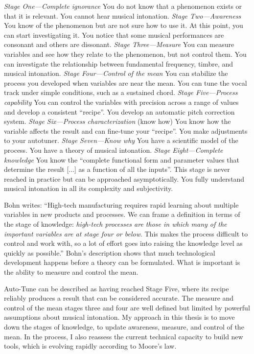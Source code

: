 \textit{Stage One---Complete ignorance} You do not know that a phenomenon exists or that it is relevant. You cannot hear musical intonation.
\textit{Stage Two---Awareness} You know of the phenomenon but are not sure how to use it. At this point, you can start investigating it. You notice that some musical performances are consonant and others are dissonant.
\textit{Stage Three---Measure}
You can measure variables and see how they relate to the phenomenon, but not control them. You can investigate the relationship between fundamental frequency, timbre, and musical intonation.
\textit{Stage Four---Control of the mean}
You can stabilize the process you developed when variables are near the mean. You can tune the vocal track under simple conditions, such as a sustained chord. 
\textit{Stage Five---Process capability}
You can control the variables with precision across a range of values and develop a consistent ``recipe''. You develop an automatic pitch correction system.
\textit{Stage Six---Process characterization} (know how)
You know how the variable affects the result and can fine-tune your ``recipe''. You make adjustments to your autotuner.
\textit{Stage Seven---Know why}
You have a scientific model of the process. You have a theory of musical intonation. 
\textit{Stage Eight---Complete knowledge}
You know the ``complete functional form and parameter values that determine the result [...] as a function of all the inputs''. This stage is never reached in practice but can be approached asymptotically. You fully understand musical intonation in all its complexity and subjectivity. 

Bohn writes: ``High-tech manufacturing requires rapid learning about multiple variables in new products and processes. We can frame a definition in terms of the stage of knowledge: \textit{high-tech processes are those in which many of the important variables are at stage four or below}. This makes the process difficult to control and work with, so a lot of effort goes into raising the knowledge level as quickly as possible.'' \cite{bohn1998measuring} Bohn's description shows that much technological development happens before a theory can be formulated. What is important is the ability to measure and control the mean. 

Auto-Tune can be described as having reached Stage Five, where its recipe reliably produces a result that can be considered accurate. The measure and control of the mean stages three and four are well defined but limited by powerful assumptions about musical intonation. My approach in this thesis is to move down the stages of knowledge, to update awareness, measure, and control of the mean. In the process, I also reassess the current technical capacity to build new tools, which is evolving rapidly according to Moore's law. 

